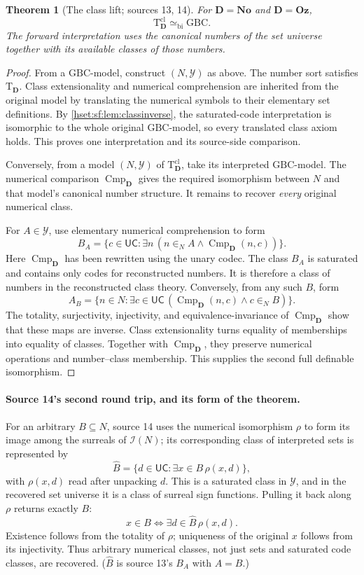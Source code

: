 \documentclass[11pt,letterpaper]{article}
\newtheorem{theorem}{Theorem}[section]
\theoremstyle{definition}
\theoremstyle{remark}
\newcommand{\No}{\mathbf{No}}
\newcommand{\I}{\mathcal I}
\newcommand{\Oz}{\mathbf{Oz}}
\newcommand{\GBC}{\mathrm{GBC}}
\newcommand{\Cmp}{\operatorname{Cmp}}
\newcommand{\UC}{\mathsf{UC}}
\newcommand{\Dd}{\mathbf{D}}
\newcommand{\Tth}{\mathrm{T}}
\newcommand{\bi}{\simeq_{\mathrm{bi}}}
\begin{document}
\begin{theorem}[The class lift; sources 13, 14]\label{hset:sf:thm:classlift}
For $\Dd=\No$ and $\Dd=\Oz$,
\[
 \Tth^{\mathrm{cl}}_{\Dd}\bi\GBC.
\]
The forward interpretation uses the canonical numbers of the set universe together
with its available classes of those numbers.
\end{theorem}
\begin{proof}
From a $\GBC$-model, construct $(N,\mathcal Y)$ as above. The number sort satisfies
$\Tth_{\Dd}$. Class extensionality and numerical comprehension are inherited from
the original model by translating the numerical symbols to their elementary set
definitions. By \cref{hset:sf:lem:classinverse}, the saturated-code interpretation
is isomorphic to the whole original $\GBC$-model, so every translated class axiom
holds. This proves one interpretation and its source-side comparison.

Conversely, from a model $(N,\mathcal Y)$ of $\Tth^{\mathrm{cl}}_{\Dd}$, take its
interpreted $\GBC$-model. The numerical comparison $\Cmp_{\Dd}$ gives the required
isomorphism between $N$ and that model's canonical number structure. It remains to
recover \emph{every} original numerical class.

For $A\in\mathcal Y$, use elementary numerical comprehension to form
\[
 B_A=\{c\in \UC:\exists n\,(n\in_N A\land \Cmp_{\Dd}(n,c))\}.
\]
Here $\Cmp_{\Dd}$ has been rewritten using the unary codec. The class $B_A$ is
saturated and contains only codes for reconstructed numbers. It is therefore a class
of numbers in the reconstructed class theory. Conversely, from any such $B$, form
\[
 A_B=\{n\in N:\exists c\in \UC\,(\Cmp_{\Dd}(n,c)\land c\in_N B)\}.
\]
The totality, surjectivity, injectivity, and equivalence-invariance of
$\Cmp_{\Dd}$ show that these maps are inverse. Class extensionality turns equality
of memberships into equality of classes. Together with $\Cmp_{\Dd}$, they preserve
numerical operations and number--class membership. This supplies the second full
definable isomorphism.
\end{proof}

\paragraph{Source 14's second round trip, and its form of the theorem.} For an
arbitrary $B\subseteq N$, source 14 uses the numerical isomorphism $\rho$ to form its
image among the surreals of $\I(N)$; its corresponding class of interpreted sets is
represented by
\begin{equation}\label{hset:sf:eq:Bhat}
 \widehat B=\{d\in \UC:\exists x\in B\,\rho(x,d)\},
\end{equation}
with $\rho(x,d)$ read after unpacking $d$. This is a saturated class in
$\mathcal Y$, and in the recovered set universe it is a class of surreal sign
functions. Pulling it back along $\rho$ returns exactly $B$:
\[
 x\in B\iff\exists d\in\widehat B\,\rho(x,d).
\]
Existence follows from the totality of $\rho$; uniqueness of the original $x$
follows from its injectivity. Thus arbitrary numerical classes, not just sets and
saturated code classes, are recovered. ($\widehat B$ is source 13's $B_A$ with
$A=B$.)
\end{document}
